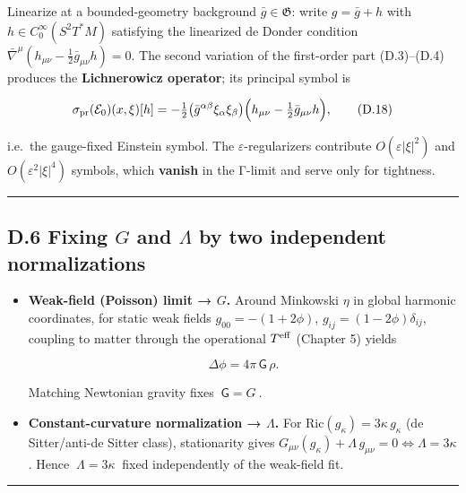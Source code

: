 \documentclass[
]{article}
\numberwithin{equation}{section}
\begin{document}
Linearize at a bounded-geometry background \(\bar g\in\mathfrak G\):
write \(g=\bar g+h\) with \(h\in C_0^\infty(S^2T^*M)\) satisfying the
linearized de Donder condition
\(\bar\nabla^\mu (h_{\mu\nu}-\tfrac12\bar g_{\mu\nu}h)=0\). The second
variation of the first-order part (D.3)--(D.4) produces the
\textbf{Lichnerowicz operator}; its principal symbol is

\[
\sigma_{\rm pr}(\mathcal E_0)(x,\xi)[h]
=-\tfrac12\big(\bar g^{\alpha\beta}\xi_\alpha\xi_\beta\big)\Big(h_{\mu\nu}-\tfrac12\bar g_{\mu\nu}h\Big),
\tag{D.18}
\]

i.e.~the gauge-fixed Einstein symbol. The \(\varepsilon\)-regularizers
contribute \(O(\varepsilon|\xi|^2)\) and \(O(\varepsilon^2|\xi|^4)\)
symbols, which \textbf{vanish} in the Γ-limit and serve only for
tightness.

\begin{center}\rule{0.5\linewidth}{0.5pt}\end{center}

\hypertarget{d.6-fixing-g-and-lambda-by-two-independent-normalizations}{%
\subsection{\texorpdfstring{D.6 Fixing \(G\) and \(\Lambda\) by two
\textbf{independent}
normalizations}{D.6 Fixing G and \textbackslash Lambda by two independent normalizations}}\label{d.6-fixing-g-and-lambda-by-two-independent-normalizations}}

\begin{itemize}
\item
  \textbf{Weak-field (Poisson) limit → \(G\).} Around Minkowski \(\eta\)
  in global harmonic coordinates, for static weak fields
  \(g_{00}=-(1+2\phi)\), \(g_{ij}=(1-2\phi)\delta_{ij}\), coupling to
  matter through the operational \(T^{\rm eff}\) (Chapter 5) yields

  \[
  \Delta\phi=4\pi\,\mathsf G\,\rho.
  \]

  Matching Newtonian gravity fixes \(\boxed{\ \mathsf G=G\ }\).
\item
  \textbf{Constant-curvature normalization → \(\Lambda\).} For
  \(\mathrm{Ric}(g_\kappa)=3\kappa\,g_\kappa\) (de Sitter/anti-de Sitter
  class), stationarity gives
  \(G_{\mu\nu}(g_\kappa)+\Lambda\,g_{\mu\nu}=0 \iff \Lambda=3\kappa\).
  Hence \(\boxed{\ \Lambda=3\kappa\ }\) fixed independently of the
  weak-field fit.
\end{itemize}

\begin{center}\rule{0.5\linewidth}{0.5pt}\end{center}
\end{document}
